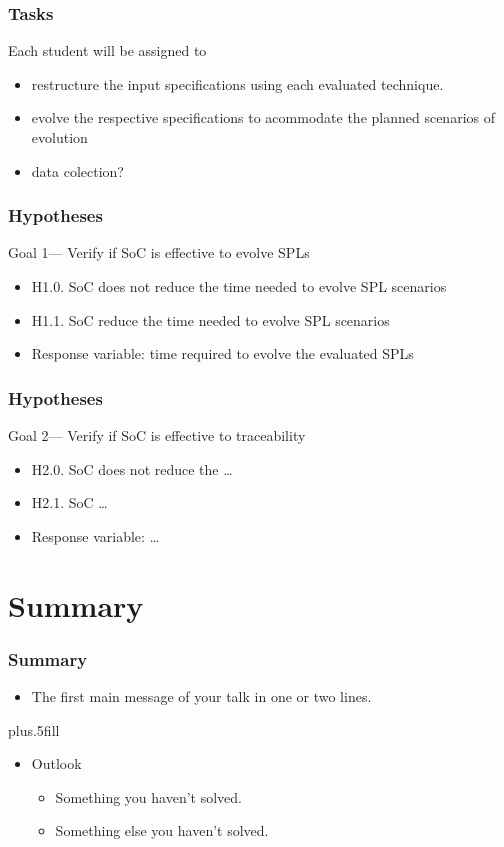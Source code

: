 \documentclass{beamer}
\begin{document}
\begin{frame}
\frametitle{Tasks}
Each student will be assigned to 

\begin{itemize}
  \item restructure the input specifications using each evaluated technique.
  \item evolve the respective specifications to acommodate the planned scenarios of evolution
  \item data colection?
\end{itemize}

\end{frame}

\begin{frame}
\frametitle{Hypotheses}
 
 \begin{block}{Goal 1--- Verify if SoC is effective to evolve SPLs}
 \begin{itemize}
   \item H1.0. SoC does not reduce the time needed to evolve SPL scenarios 
   \item H1.1. SoC reduce the time needed to evolve SPL scenarios
   \item \alert{Response variable:} time required to evolve the evaluated SPLs	
 \end{itemize}
 \end{block}
\end{frame}

\begin{frame}
\frametitle{Hypotheses}
 \begin{block}{Goal 2--- Verify if SoC is effective to traceability}
 \begin{itemize}
   \item H2.0. SoC does not reduce the \ldots 
   \item H2.1. SoC \ldots
   \item \alert{Response variable:} \ldots	
 \end{itemize}
 \end{block}
\end{frame}

\section*{Summary}

\begin{frame}
\frametitle<presentation>{Summary}

\begin{itemize}
  \item The \alert{first main message} of your talk in one or two lines.
\end{itemize}

\vskip0pt plus.5fill
\begin{itemize}
  \item Outlook
  \begin{itemize}
    \item Something you haven't solved.
    \item Something else you haven't solved.
  \end{itemize}
\end{itemize}
\end{frame}
\end{document}
